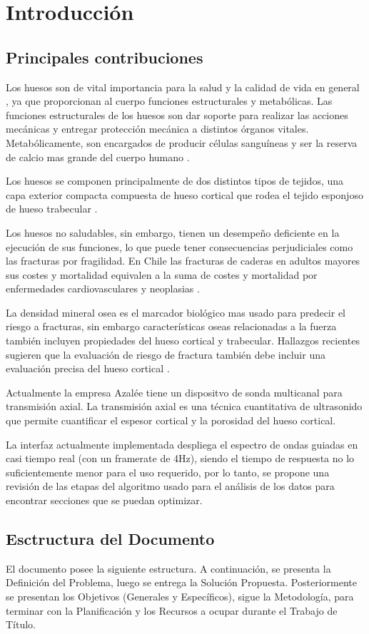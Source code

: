 
\chapter{Introducci\'on}


\section{Principales contribuciones}

Los huesos son de vital importancia para la salud y la calidad de vida en general
\cite{US},
ya que proporcionan al cuerpo funciones estructurales y metabólicas.
Las funciones estructurales de los huesos son dar soporte para realizar las
acciones mecánicas y entregar protección mecánica a distintos órganos vitales.
Metabólicamente, son encargados de producir células sanguíneas y ser la
reserva de calcio mas grande del cuerpo humano
\cite{Lorincz2009}.

Los huesos se componen principalmente de dos distintos tipos de tejidos, una
capa exterior compacta compuesta de hueso cortical que rodea el tejido esponjoso
de hueso trabecular
\cite{Cooper2016}.

Los huesos no saludables, sin embargo, tienen un desempeño deficiente en la
ejecución de sus funciones, lo que puede tener consecuencias perjudiciales como
las fracturas por fragilidad\cite{US}.
En Chile las fracturas de caderas  en adultos mayores sus costes y mortalidad
equivalen a la suma de costes y mortalidad por enfermedades cardiovasculares y
neoplasias
\cite{DINAMARCA-MONTECINOS2015}.

La densidad mineral osea es el marcador biológico mas usado para predecir el
riesgo a fracturas, sin embargo características oseas relacionadas a la fuerza
también incluyen propiedades del hueso cortical y trabecular.
Hallazgos recientes sugieren que la evaluación de riesgo de fractura también
debe incluir una evaluación precisa del hueso cortical
\cite{Bala2015}.

Actualmente la empresa Azalée tiene un dispositvo de sonda multicanal para
transmisión axial.
La transmisión axial es una técnica cuantitativa de ultrasonido que permite
cuantificar el espesor cortical y la porosidad del hueso cortical.

La interfaz actualmente implementada despliega el espectro de ondas guiadas en
casi tiempo real (con un framerate de 4Hz),
siendo el tiempo de respuesta no lo suficientemente menor para el uso requerido,
por lo tanto, se propone una revisión de las etapas del algoritmo usado para el
análisis de los datos para encontrar secciones que se puedan optimizar.

\section{Esctructura del Documento}

El documento posee la siguiente estructura.
A continuación, se presenta la Definición del Problema, luego se entrega la
Solución Propuesta.
Posteriormente se presentan los Objetivos (Generales y Específicos),
sigue la Metodología, para terminar con la Planificación y los Recursos a ocupar
durante el Trabajo de Título.
